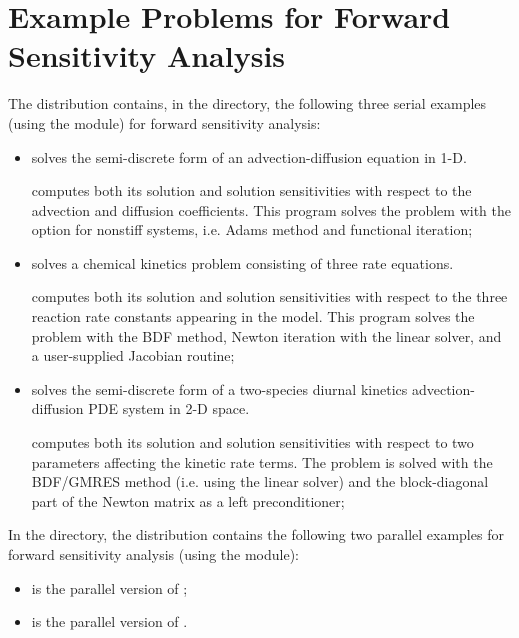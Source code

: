 \chapter{Example Problems for Forward Sensitivity Analysis}\label{s:fwd_examples}

The {\cvodes} distribution contains, in the 
directory, the following three serial examples (using the {\nvecs} module)
for forward sensitivity analysis:
\begin{itemize}
\item {}
  solves the semi-discrete form of an advection-diffusion equation in 1-D.

  {\cvodes} computes both its solution and solution sensitivities with respect
  to the advection and diffusion coefficients.
  This program solves the problem with the option for nonstiff systems,
  i.e. Adams method and functional iteration;
\item {}
  solves a chemical kinetics problem consisting of three rate equations.

  {\cvodes} computes both its solution and solution sensitivities with respect
  to the three reaction rate constants appearing in the model. 
  This program solves the problem with the BDF method, Newton          
  iteration with the {\cvdense} linear solver, and a user-supplied    
  Jacobian routine;
\item {}
  solves the semi-discrete form of a two-species diurnal kinetics
  advection-diffusion PDE system in 2-D space.

  {\cvodes} computes both its solution and solution sensitivities with respect
  to two parameters affecting the kinetic rate terms.
  The problem is solved with the BDF/GMRES method (i.e.    
  using the {\cvspgmr} linear solver) and the block-diagonal part of the  
  Newton matrix as a left preconditioner;
\end{itemize}

\noindent In the  directory, the {\cvodes} distribution 
contains the following two parallel examples for forward sensitivity analysis
(using the {\nvecp} module):
\begin{itemize}
\item {}
  is the parallel version of ;
\item {}
  is the parallel version of .
\end{itemize}

